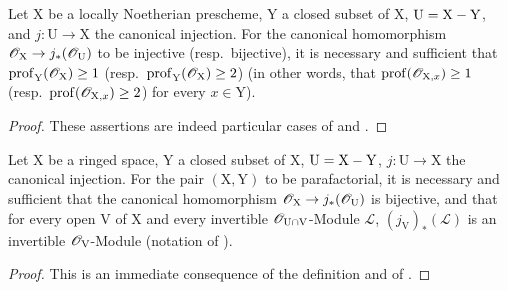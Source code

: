 \begin{lemma}[21.13.4]
\label{IV.21.13.4}
Let $\mathrm{X}$ be a locally Noetherian prescheme, $\mathrm{Y}$ a closed subset of $\mathrm{X}$, $\mathrm{U}=\mathrm{X}-\mathrm{Y}$, and $j:\mathrm{U}\to\mathrm{X}$ the canonical injection.
For the canonical homomorphism $\mathscr{O}_{\mathrm{X}}\to j_*(\mathscr{O}_{\mathrm{U}})$ to be injective \textup{(resp.}\ bijective\textup{)}, it is necessary and sufficient that $\operatorname{prof}_{\mathrm{Y}}(\mathscr{O}_{\mathrm{X}})\geq 1$ \textup{(resp.\ $\operatorname{prof}_{\mathrm{Y}}(\mathscr{O}_{\mathrm{X}})\geq 2$) (in other words, that $\operatorname{prof}(\mathscr{O}_{\mathrm{X},x})\geq 1$ (resp.\ $\operatorname{prof}(\mathscr{O}_{\mathrm{X},x})\geq 2$) for every $x\in\mathrm{Y}$)}.
\end{lemma}

\begin{proof}
These assertions are indeed particular cases of  and .
\end{proof}

\begin{proposition}[21.13.5]
\label{IV.21.13.5}
Let $\mathrm{X}$ be a ringed space, $\mathrm{Y}$ a closed subset of $\mathrm{X}$, $\mathrm{U}=\mathrm{X}-\mathrm{Y}$, $j:\mathrm{U}\to\mathrm{X}$ the canonical injection.
For the pair $(\mathrm{X},\mathrm{Y})$ to be parafactorial, it is necessary and sufficient that the canonical homomorphism $\mathscr{O}_{\mathrm{X}}\to j_*(\mathscr{O}_{\mathrm{U}})$ is bijective, and that for every open $\mathrm{V}$ of $\mathrm{X}$ and every invertible $\mathscr{O}_{\mathrm{U}\cap\mathrm{V}}$-Module $\mathscr{L}$, $(j_{\mathrm{V}})_*(\mathscr{L})$ is an invertible $\mathscr{O}_{\mathrm{V}}$-Module (notation of ).
\end{proposition}

\begin{proof}
This is an immediate consequence of the definition  and of .
\end{proof}

